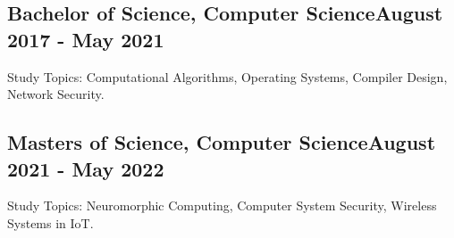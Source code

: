 \vspace*{10pt}
\subsection{{Bachelor of Science, Computer Science}\hfill August 2017 - May 2021}
\vspace*{5pt}
\vspace*{5pt}
Study Topics: Computational Algorithms, Operating Systems, Compiler Design, Network Security.  

\vspace*{15pt}
\subsection{{Masters of Science, Computer Science}\hfill August 2021 - May 2022}
\vspace*{5pt}
\vspace*{5pt}
Study Topics: Neuromorphic Computing, Computer System Security, Wireless Systems in IoT. 
